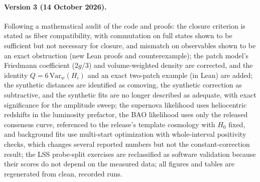 \documentclass[11pt]{article}
\theoremstyle{plain}
\theoremstyle{definition}
\theoremstyle{remark}
\begin{document}
\paragraph{Version 3 (14 October 2026).} Following a mathematical audit of the code and proofs:
the closure criterion is stated as fiber compatibility, with commutation on full states shown to be sufficient but not necessary for closure, and mismatch on observables shown to be an exact obstruction (new Lean proofs and counterexample);
the patch model's Friedmann coefficient ($2g/3$) and volume-weighted density are corrected, and the identity $Q=6\,\mathrm{Var}_w(H_i)$ and an exact two-patch example (in Lean) are added;
the synthetic distances are identified as comoving, the synthetic correction as subtractive, and the synthetic fits are no longer described as adequate, with exact significance for the amplitude sweep;
the supernova likelihood uses heliocentric redshifts in the luminosity prefactor, the BAO likelihood uses only the released consensus curve, referenced to the release's template cosmology with $H_0$ fixed, and background fits use multi-start optimization with whole-interval positivity checks, which changes several reported numbers but not the constant-correction result;
the LSS probe-split exercises are reclassified as software validation because their scores do not depend on the measured data;
all figures and tables are regenerated from clean, recorded runs.



\end{document}
